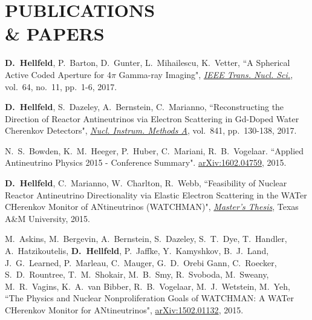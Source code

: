 \section{\small{PUBLICATIONS \\\& PAPERS}}

\begin{thebibliography}{3}
 \raggedright
\vspace{10pt}

 \textbf{D.~Hellfeld}, P.~Barton, D.~Gunter, L.~Mihailescu, K.~Vetter, ``A Spherical Active Coded Aperture for 4$\pi$ Gamma-ray Imaging", \href{http://ieeexplore.ieee.org/document/8048531/}{\emph{IEEE Trans. Nucl. Sci.}}, vol.~64, no.~11, pp.~1-6, 2017.
 
 \textbf{D.~Hellfeld}, S.~Dazeley, A.~Bernstein, C.~Marianno, ``Reconstructing the Direction of Reactor Antineutrinos via Electron Scattering in Gd-Doped Water Cherenkov Detectors", \href{http://www.sciencedirect.com/science/article/pii/S0168900216310555}{\emph{Nucl. Instrum. Methods A}}, vol.~841, pp.~130-138, 2017.

 N.~S.~Bowden, K.~M.~Heeger, P.~Huber, C.~Mariani, R.~B.~Vogelaar. ``Applied Antineutrino Physics 2015 - Conference Summary". \href{http://arxiv.org/abs/1602.04759}{arXiv:1602.04759}, 2015.

 \textbf{D.~Hellfeld}, C.~Marianno, W.~Charlton, R.~Webb, ``Feasibility of Nuclear Reactor Antineutrino Directionality via Elastic Electron Scattering in the WATer CHerenkov Monitor of ANtineutrinos (WATCHMAN)", \href{http://hdl.handle.net/1969.1/155140}{\emph{Master's Thesis}}, Texas A\&M University, 2015.

 M.~Askins, M.~Bergevin, A.~Bernstein, S.~Dazeley, S.~T.~Dye, T.~Handler, A.~Hatzikoutelis, \textbf{D.~Hellfeld}, P.~Jaffke, Y.~Kamyshkov, B.~J.~Land, J.~G.~Learned, P.~Marleau, C.~Mauger, G.~D.~Orebi Gann, C.~Roecker, S.~D.~Rountree, T.~M.~Shokair, M.~B.~Smy, R.~Svoboda, M.~Sweany, M.~R.~Vagins, K.~A.~van Bibber, R.~B.~Vogelaar, M.~J.~Wetstein, M.~Yeh, ``The Physics and Nuclear Nonproliferation Goals of WATCHMAN: A WATer CHerenkov Monitor for ANtineutrinos", \href{http://arxiv.org/pdf/1502.01132.pdf}{arXiv:1502.01132}, 2015.

\end{thebibliography}